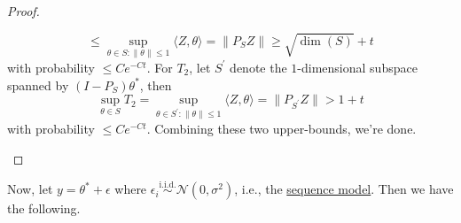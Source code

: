 \begin{proof}
\begin{itemize}
\[			      \leq \sup _{\theta \in S \colon \lVert \theta \rVert \leq 1} \langle Z, \theta  \rangle
			      = \lVert P_S Z \rVert
			      \geq \sqrt{\dim (S)} + t
		      \]
		      with probability \(\leq C e^{-Ct}\). For \(T_2\), let \(S^{\prime} \) denote the \(1\)-dimensional subspace spanned by \((I - P_S)\theta ^{\ast} \), then
		      \[
			      \sup _{\theta \in S} T_2
			      = \sup _{\theta \in S^{\prime} \colon \lVert \theta \rVert \leq 1} \langle Z, \theta  \rangle
			      = \lVert P_{S^{\prime} } Z \rVert
			      > 1 + t
		      \]
		      with probability \(\leq C e^{-Ct}\). Combining these two upper-bounds, we're done.
	\end{itemize}
\end{proof}

Now, let \(y = \theta ^{\ast} + \epsilon \) where \(\epsilon _i \overset{\text{i.i.d.} }{\sim } \mathcal{N} (0, \sigma ^2)\), i.e., the \hyperref[not:sequence-model]{sequence model}. Then we have the following.

